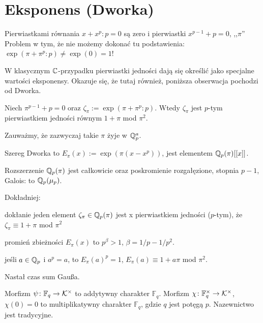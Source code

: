 \section{Eksponens (Dworka)}
Pierwiastkami równania $x + x^p:p = 0$ są zero i pierwiastki $x^{p-1} + p = 0$, ,,$\pi$''
Problem w tym, że nie możemy dokonać tu podstawienia: $\exp(\pi + \pi^p:p) \neq \exp(0) = 1$!

W klasycznym $\mathbb C$-przypadku pierwiastki jedności dają się określić jako specjalne wartości eksponensy.
Okazuje się, że tutaj również, poniższa obserwacja pochodzi od Dworka.

\begin{fakt}
	Niech $\pi^{p-1} + p = 0$ oraz $\zeta_\pi := \exp(\pi + \pi^p:p)$.
	Wtedy $\zeta_\pi$ jest $p$-tym pierwiastkiem jedności równym $1 + \pi$ mod $\pi^2$.
\end{fakt}

Zauważmy, że zazwyczaj takie $\pi$ żyje w $\mathbb Q_p^a$.

\begin{definicja}
	Szereg Dworka to $E_\pi(x) := \exp(\pi(x-x^p))$, jest elementem $\mathbb Q_p(\pi)[[x]]$.
\end{definicja}

\begin{twierdzenie}[Dwork]
	Rozszerzenie $\mathbb Q_p(\pi)$ jest całkowicie oraz poskromienie rozgałęzione, stopnia $p-1$, Galois: to $\mathbb Q_p(\mu_p)$.
\end{twierdzenie}

Dokładniej:
\begin{enumx}
	\item dokłanie jeden element $\zeta_\pi \in \mathbb Q_p(\pi)$ jest x pierwiastkiem jedności ($p$-tym), że $\zeta_\pi \equiv 1 + \pi$ mod $\pi^2$
	\item promień zbieżności $E_\pi(x)$ to $p^\beta > 1$, $\beta = 1/p - 1/p^2$.
	\item jeśli $a \in \mathbb Q_p$ i $a^p = a$, to $E_\pi(a)^p = 1$, $E_\pi(a) \equiv 1 + a\pi$ mod $\pi^2$.
\end{enumx}

Nastał czas sum Gaußa.

\begin{definicja}
	Morfizm $\psi \colon \mathbb F_q \to \mathcal K^\times$ to addytywny charakter $\mathbb F_q$.
	Morfizm $\chi \colon \mathbb F_q^\times \to \mathcal K^\times$, $\chi(0) = 0$ to multiplikatywny charakter $\mathbb F_q$, gdzie $q$ jest potęgą $p$.
	Nazewnictwo jest tradycyjne.
\end{definicja}

